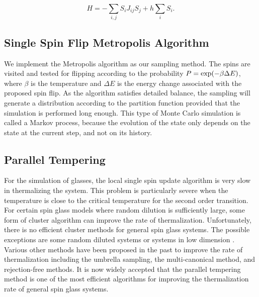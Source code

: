 \begin{equation}
H = - \sum_{i,j} S_i J_{ij} S_j + h \sum_{i} S_i.
\end{equation}


\subsection{Single Spin Flip Metropolis Algorithm}

We implement the Metropolis algorithm as our sampling method. The spins are 
visited and tested for flipping according to the probability $P = \mathrm{exp}(-\beta\Delta E)$,
where $\beta$ is the temperature and $\Delta E$ is the energy change associated 
with the proposed spin flip. As the algorithm satisfies detailed balance, the sampling 
will generate a distribution according to the partition function provided that the 
simulation is performed long enough.  This type of Monte Carlo simulation is
called a Markov process, because the evolution of the state only depends on the state 
at the current step, and not on its history. 

\subsection{Parallel Tempering}
\label{sec:PT}
For the simulation of glasses, the local single spin 
update algorithm is very slow in thermalizing the system. This problem is particularly 
severe when the temperature is close to the critical temperature for the second order 
transition. For certain spin glass models where random dilution is sufficiently 
large, some form of cluster algorithm can improve the rate of thermalization. Unfortunately, 
there is no efficient cluster methods for general spin glass systems. The possible exceptions are 
some random diluted systems or systems in low dimension \cite{Houdayer-2001,Liang-1992,Jorg-2005}. Various other methods have been proposed 
in the past to improve the rate of thermalization including the umbrella sampling, 
the multi-canonical method, and rejection-free methods. It is now widely accepted that 
the parallel tempering method is one of the most efficient algorithms for improving 
the thermalization rate of general spin glass systems.

